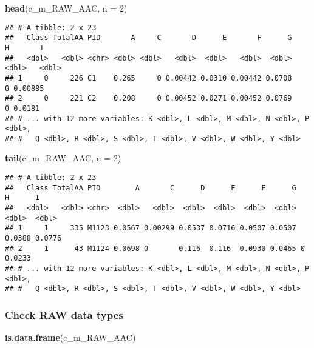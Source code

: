 \documentclass[]{article}
\newenvironment{Shaded}{\begin{snugshade}}{\end{snugshade}}
\newcommand{\DataTypeTok}[1]{\textcolor[rgb]{0.13,0.29,0.53}{#1}}
\newcommand{\DecValTok}[1]{\textcolor[rgb]{0.00,0.00,0.81}{#1}}
\newcommand{\KeywordTok}[1]{\textcolor[rgb]{0.13,0.29,0.53}{\textbf{#1}}}
\newcommand{\NormalTok}[1]{#1}
\begin{document}
\begin{Shaded}
\begin{Highlighting}[]
\KeywordTok{head}\NormalTok{(c_m_RAW_AAC, }\DataTypeTok{n =} \DecValTok{2}\NormalTok{)}
\end{Highlighting}
\end{Shaded}

\begin{verbatim}
## # A tibble: 2 x 23
##   Class TotalAA PID       A     C       D      E       F      G     H       I
##   <dbl>   <dbl> <chr> <dbl> <dbl>   <dbl>  <dbl>   <dbl>  <dbl> <dbl>   <dbl>
## 1     0     226 C1    0.265     0 0.00442 0.0310 0.00442 0.0708     0 0.00885
## 2     0     221 C2    0.208     0 0.00452 0.0271 0.00452 0.0769     0 0.0181 
## # ... with 12 more variables: K <dbl>, L <dbl>, M <dbl>, N <dbl>, P <dbl>,
## #   Q <dbl>, R <dbl>, S <dbl>, T <dbl>, V <dbl>, W <dbl>, Y <dbl>
\end{verbatim}

\begin{Shaded}
\begin{Highlighting}[]
\KeywordTok{tail}\NormalTok{(c_m_RAW_AAC, }\DataTypeTok{n =} \DecValTok{2}\NormalTok{)}
\end{Highlighting}
\end{Shaded}

\begin{verbatim}
## # A tibble: 2 x 23
##   Class TotalAA PID        A       C      D      E      F      G      H      I
##   <dbl>   <dbl> <chr>  <dbl>   <dbl>  <dbl>  <dbl>  <dbl>  <dbl>  <dbl>  <dbl>
## 1     1     335 M1123 0.0567 0.00299 0.0537 0.0716 0.0507 0.0507 0.0388 0.0776
## 2     1      43 M1124 0.0698 0       0.116  0.116  0.0930 0.0465 0      0.0233
## # ... with 12 more variables: K <dbl>, L <dbl>, M <dbl>, N <dbl>, P <dbl>,
## #   Q <dbl>, R <dbl>, S <dbl>, T <dbl>, V <dbl>, W <dbl>, Y <dbl>
\end{verbatim}

\hypertarget{check-raw-data-types}{%
\subsubsection{Check RAW data types}\label{check-raw-data-types}}

\begin{Shaded}
\begin{Highlighting}[]
\KeywordTok{is.data.frame}\NormalTok{(c_m_RAW_AAC)}
\end{Highlighting}
\end{Shaded}
\end{document}
